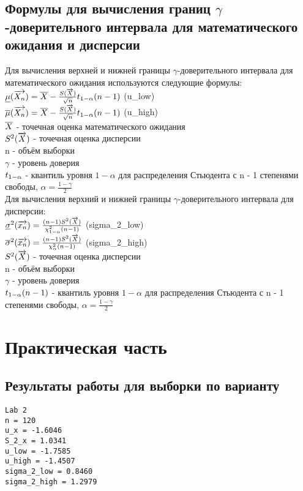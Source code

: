 \section{Формулы для вычисления границ $\gamma$-доверительного интервала для математического ожидания и дисперсии}
Для вычисления верхней и нижней границы $\gamma$-доверительного интервала для математического ожидания используются следующие формулы:\\
$\underline{\mu}(\overrightarrow{X_{n}}) = \overline{X} - \frac{S(\overrightarrow{X})}{\sqrt{n}}t_{1 - \alpha}(n - 1)$ (u\_low)\\
$\overline{\mu}(\overrightarrow{X_{n}}) = \overline{X} - \frac{S(\overrightarrow{X})}{\sqrt{n}}t_{1 - \alpha}(n - 1)$ (u\_high)\\
$\overline{X}$ - точечная оценка математического ожидания\\
$S^{2}(\overrightarrow{X})$ - точечная оценка дисперсии\\
n - объём выборки\\
$\gamma$ - уровень доверия\\
$t_{1 - \alpha}$ - квантиль уровня $1 - \alpha$ для распределения Стьюдента с n - 1 степенями свободы, $\alpha = \frac{1 - \gamma}{2}$\\

Для вычисления верхний и нижней границы $\gamma$-доверительного интервала для дисперсии:\\
$\underline{\sigma}^{2}(\overrightarrow{x_{n}}) = \frac{(n - 1)S^{2}(\overrightarrow{X})}{\chi^{2}_{1 - \alpha}(n - 1)}$  (sigma\_2\_low)\\
$\overline{\sigma}^{2}(\overrightarrow{x_{n}}) = \frac{(n - 1)S^{2}(\overrightarrow{X})}{\chi^{2}_{\alpha}(n - 1)}$ (sigma\_2\_high)\\
$S^{2}(\overrightarrow{X})$ - точечная оценка дисперсии\\
n - объём выборки\\
$\gamma$ - уровень доверия\\
$t_{1 - \alpha}(n - 1)$ - квантиль уровня $1 - \alpha$ для распределения Стьюдента с n - 1 степенями свободы, $\alpha = \frac{1 - \gamma}{2}$\\

\chapter{Практическая часть}

\section{Результаты работы для выборки по варианту}
\begin{lstlisting}
Lab 2
n = 120
u_x = -1.6046
S_2_x = 1.0341
u_low = -1.7585
u_high = -1.4507
sigma_2_low = 0.8460
sigma_2_high = 1.2979
\end{lstlisting}

